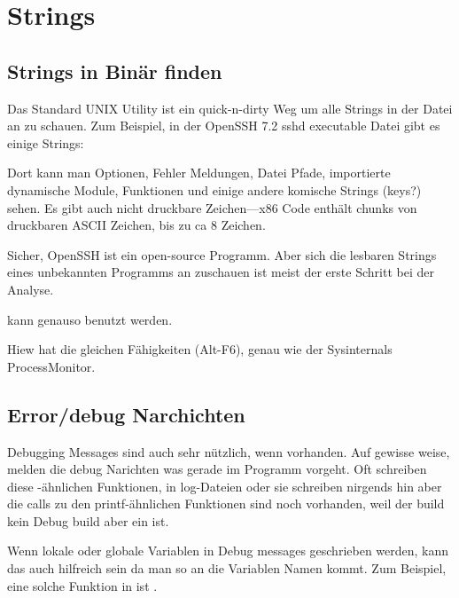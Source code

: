 \section{Strings}
\label{sec:digging_strings}



\subsection{Strings in Bin\"ar finden}

Das Standard UNIX  Utility ist ein quick-n-dirty Weg um alle Strings in der 
Datei an zu schauen. Zum Beispiel, in der OpenSSH 7.2 sshd executable Datei gibt es einige Strings:



Dort kann man Optionen, Fehler Meldungen, Datei Pfade, importierte dynamische Module, Funktionen und einige andere komische 
Strings (keys?) sehen. Es gibt auch nicht druckbare Zeichen---x86 Code enth\"alt chunks von druckbaren ASCII Zeichen, bis zu ca 8 Zeichen. %

Sicher, OpenSSH ist ein open-source Programm.
Aber sich die lesbaren Strings eines unbekannten Programms an zuschauen ist meist der erste Schritt bei 
der Analyse. 

 kann genauso benutzt werden.

Hiew hat die gleichen F\"ahigkeiten (Alt-F6), genau wie der Sysinternals ProcessMonitor.

\subsection{Error/debug Narchichten}

Debugging Messages sind auch sehr n\"utzlich, wenn vorhanden.
Auf gewisse weise, melden die debug Narichten was gerade
im Programm vorgeht. Oft schreiben diese \printf-\"ahnlichen Funktionen, in
log-Dateien oder sie schreiben nirgends hin aber die calls zu den printf-\"ahnlichen Funktionen sind noch vorhanden, 
weil der build kein Debug build aber ein  ist. %
\myindex{\oracle}

Wenn lokale oder globale Variablen in Debug messages geschrieben werden, kann das auch 
hilfreich sein da man so an die Variablen Namen kommt.
Zum Beispiel, eine solche Funktion in \oracle ist .

